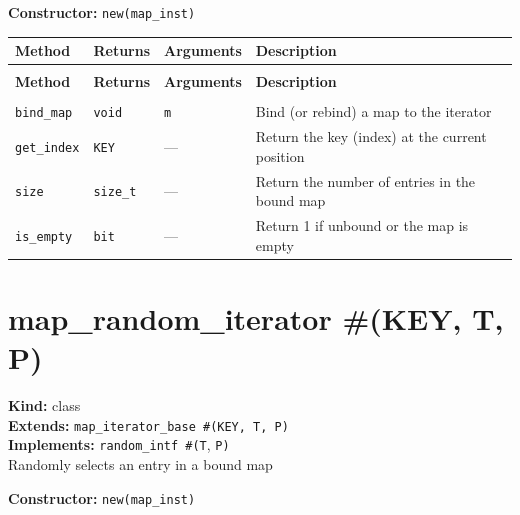 \documentclass[11pt,letterpaper]{report}
\begin{document}
\noindent\textbf{Constructor:} \texttt{new(map\_inst)}

\begin{xltabular}{\linewidth}{>{\small}p{1.35in} >{\small}p{1.25in} >{\small}p{0.95in} >{\small}X}
\toprule
\textbf{Method} & \textbf{Returns} & \textbf{Arguments} & \textbf{Description} \\
\midrule
\endfirsthead
{} \\
\midrule
\textbf{Method} & \textbf{Returns} & \textbf{Arguments} & \textbf{Description} \\
\midrule
\endhead
\midrule
{} \\
\endfoot
\bottomrule
\endlastfoot
\texttt{bind\_map} & \texttt{void} & \texttt{m} & Bind (or rebind) a map to the iterator \\
\texttt{get\_index} & \texttt{KEY} & --- & Return the key (index) at the current position \\
\texttt{size} & \texttt{size\_t} & --- & Return the number of entries in the bound map \\
\texttt{is\_empty} & \texttt{bit} & --- & Return 1 if unbound or the map is empty \\
\end{xltabular}

\section{map\_random\_iterator \#(KEY, T, P)}
\label{cls:maprandomiteratorKEYTP}

\noindent\textbf{Kind:} class\\
\noindent\textbf{Extends:} \texttt{map\_iterator\_base \#(KEY, T, P)}\\
\noindent\textbf{Implements:} \texttt{random\_intf \#(T}, \texttt{P)}\\
\noindent Randomly selects an entry in a bound map

\noindent\textbf{Constructor:} \texttt{new(map\_inst)}
\end{document}
